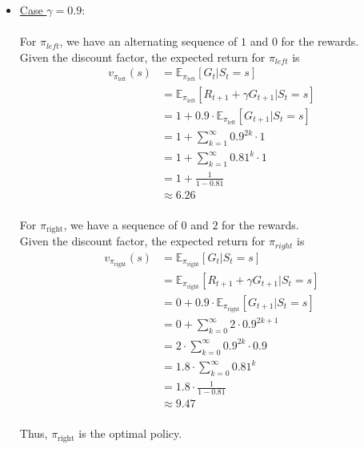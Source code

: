 \documentclass{article}
\begin{document}
\begin{itemize}
    \item \underline{Case $\gamma=0.9$}:\\\\
    For $\pi_{left}$, we have an alternating sequence of $1$ and $0$ for the rewards.\\
    Given the discount factor, the expected return for $\pi_{left}$ is
    \begin{equation*}
        \begin{aligned}
            v_{\pi_{\text{left}}}(s) &= \mathbb{E}_{\pi_{\text{left}}}[G_t | S_t=s]\\
            &= \mathbb{E}_{\pi_{\text{left}}}[R_{t+1} + \gamma G_{t+1} | S_t=s]\\
            &= 1 + 0.9\cdot \mathbb{E}_{\pi_{\text{left}}}[G_{t+1} | S_t=s]\\
            &= 1 + \sum_{k=1}^{\infty} 0.9^{2k}\cdot 1\\
            &= 1 + \sum_{k=1}^{\infty} 0.81^{k}\cdot 1\\
            &= 1 + \frac{1}{1-0.81}\\
            &\approx 6.26\\
        \end{aligned}
    \end{equation*}\par
    For $\pi_{\text{right}}$, we have a sequence of $0$ and $2$ for the rewards.\\
    Given the discount factor, the expected return for $\pi_{right}$ is
    \begin{equation*}
        \begin{aligned}
            v_{\pi_{\text{right}}}(s) &= \mathbb{E}_{\pi_{\text{right}}}[G_t | S_t=s]\\
            &= \mathbb{E}_{\pi_{\text{right}}}[R_{t+1} + \gamma G_{t+1} | S_t=s]\\
            &= 0 + 0.9\cdot \mathbb{E}_{\pi_{\text{right}}}[G_{t+1} | S_t=s]\\
            &= 0 + \sum_{k=0}^{\infty} 2\cdot 0.9^{2k+1}\\
            &= 2\cdot \sum_{k=0}^{\infty} 0.9^{2k}\cdot 0.9\\
            &= 1.8\cdot \sum_{k=0}^{\infty} 0.81^{k}\\
            &= 1.8\cdot \frac{1}{1-0.81}\\
            &\approx 9.47\\
        \end{aligned}
    \end{equation*}\par
    Thus, $\pi_{\text{right}}$ is the optimal policy.\\\\


\end{itemize}
\end{document}
